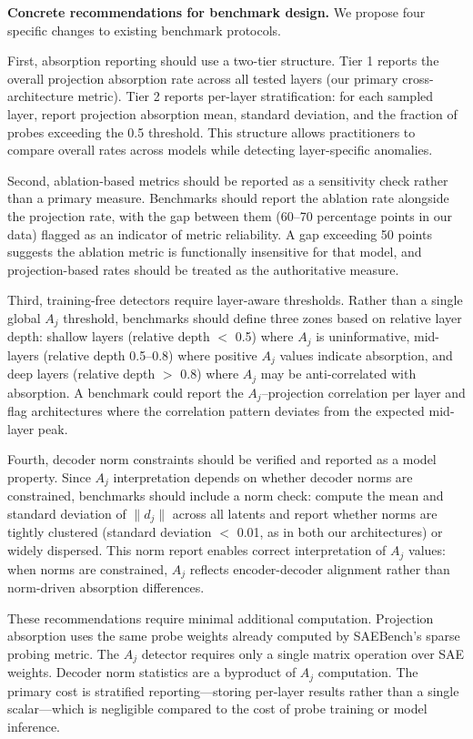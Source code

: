 \documentclass{article}
\begin{document}
\textbf{Concrete recommendations for benchmark design.} We propose four specific changes to existing benchmark protocols.

First, absorption reporting should use a two-tier structure. Tier 1 reports the overall projection absorption rate across all tested layers (our primary cross-architecture metric). Tier 2 reports per-layer stratification: for each sampled layer, report projection absorption mean, standard deviation, and the fraction of probes exceeding the 0.5 threshold. This structure allows practitioners to compare overall rates across models while detecting layer-specific anomalies.

Second, ablation-based metrics should be reported as a sensitivity check rather than a primary measure. Benchmarks should report the ablation rate alongside the projection rate, with the gap between them (60--70 percentage points in our data) flagged as an indicator of metric reliability. A gap exceeding 50 points suggests the ablation metric is functionally insensitive for that model, and projection-based rates should be treated as the authoritative measure.

Third, training-free detectors require layer-aware thresholds. Rather than a single global $A_j$ threshold, benchmarks should define three zones based on relative layer depth: shallow layers (relative depth $<$ 0.5) where $A_j$ is uninformative, mid-layers (relative depth 0.5--0.8) where positive $A_j$ values indicate absorption, and deep layers (relative depth $>$ 0.8) where $A_j$ may be anti-correlated with absorption. A benchmark could report the $A_j$--projection correlation per layer and flag architectures where the correlation pattern deviates from the expected mid-layer peak.

Fourth, decoder norm constraints should be verified and reported as a model property. Since $A_j$ interpretation depends on whether decoder norms are constrained, benchmarks should include a norm check: compute the mean and standard deviation of $\|d_j\|$ across all latents and report whether norms are tightly clustered (standard deviation $<$ 0.01, as in both our architectures) or widely dispersed. This norm report enables correct interpretation of $A_j$ values: when norms are constrained, $A_j$ reflects encoder-decoder alignment rather than norm-driven absorption differences.

These recommendations require minimal additional computation. Projection absorption uses the same probe weights already computed by SAEBench's sparse probing metric. The $A_j$ detector requires only a single matrix operation over SAE weights. Decoder norm statistics are a byproduct of $A_j$ computation. The primary cost is stratified reporting---storing per-layer results rather than a single scalar---which is negligible compared to the cost of probe training or model inference.
\end{document}
